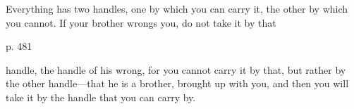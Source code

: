 Everything has two handles,  one by which you can carry it,  the other by which
you cannot. If your brother wrongs you, do not take it by that

p. 481

handle, the handle of his wrong, for you cannot carry it by that, but rather by
the other handle—that he is a brother, brought up with you, and then you will
take it by the handle that you can carry by.

